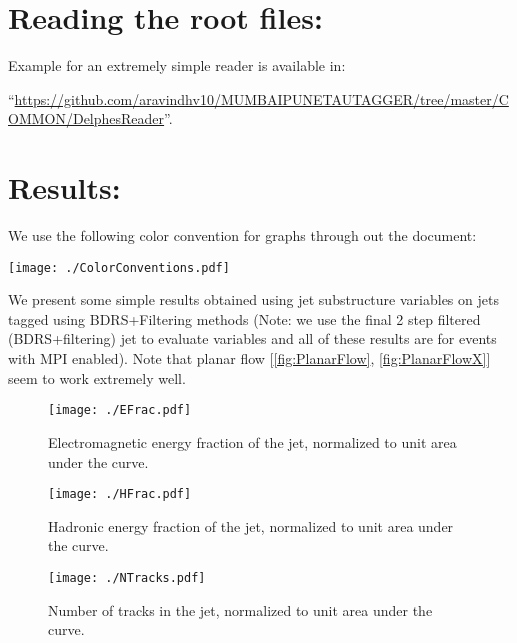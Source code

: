 \section{Reading the root files:}
Example for an extremely simple reader is available in:
\begin{flushleft}
    ``\small{\url{https://github.com/aravindhv10/MUMBAIPUNETAUTAGGER/tree/master/COMMON/DelphesReader}}''.
\end{flushleft}

\section{Results:}
We use the following color convention for graphs through out the document:
\begin{center}
    \texttt{[image: ./ColorConventions.pdf]}
\end{center}
We present some simple results obtained using jet substructure variables on jets tagged using BDRS+Filtering methods (Note: we use the final 2 step filtered (BDRS+filtering) jet to evaluate variables and all of these results are for events with MPI enabled). Note that planar flow [\autoref{fig:PlanarFlow}, \autoref{fig:PlanarFlowX}] seem to work extremely well.

\begin{figure}
    \begin{center}
        \texttt{[image: ./EFrac.pdf]}
        \caption{ Electromagnetic energy fraction of the jet, normalized to unit area under the curve. }
        \label{fig:EFrac}
    \end{center}
\end{figure}

\begin{figure}
    \begin{center}
        \texttt{[image: ./HFrac.pdf]}
        \caption{ Hadronic energy fraction of the jet, normalized to unit area under the curve. }
        \label{fig:HFrac}
    \end{center}
\end{figure}

\begin{figure}
    \begin{center}
        \texttt{[image: ./NTracks.pdf]}
        \caption{ Number of tracks in the jet, normalized to unit area under the curve. }
        \label{fig:NTracks}
    \end{center}
\end{figure}

